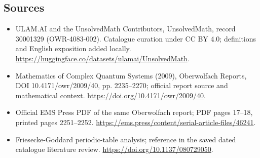 \documentclass[11pt]{article}
\begin{document}
\subsection{Sources}
\begin{itemize}
\item[\hypertarget{source:30001329:1}{S1}] ULAM.AI and the UnsolvedMath Contributors, UnsolvedMath, record 30001329 (OWR-4083-002). Catalogue curation under CC BY 4.0; definitions and English exposition added locally.
\url{https://huggingface.co/datasets/ulamai/UnsolvedMath}.
\item[\hypertarget{source:30001329:2}{S2}] Mathematics of Complex Quantum Systems (2009), Oberwolfach Reports, DOI 10.4171/owr/2009/40, pp. 2235--2270; official report source and mathematical context.
\url{https://doi.org/10.4171/owr/2009/40}.
\item[\hypertarget{source:30001329:3}{S3}] Official EMS Press PDF of the same Oberwolfach report; PDF pages 17--18, printed pages 2251--2252.
\url{https://ems.press/content/serial-article-files/46241}.
\item[\hypertarget{source:30001329:4}{S4}] Friesecke-Goddard periodic-table analysis; reference in the saved dated catalogue literature review.
\url{https://doi.org/10.1137/080729050}.
\end{itemize}
\label{end:30001329}
\end{document}
